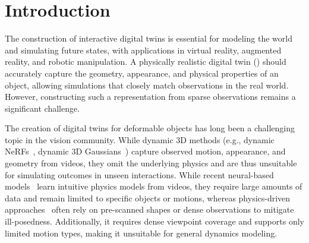 \vspace{-20pt}
\section{Introduction}

The construction of interactive digital twins is essential for modeling the world and simulating future states, with applications in virtual reality, augmented reality, and robotic manipulation. A physically realistic digital twin (\ourabbr) should accurately capture the geometry, appearance, and physical properties of an object, allowing simulations that closely match observations in the real world. However, constructing such a representation from sparse observations remains a significant challenge.

The creation of digital twins for deformable objects has long been a challenging topic in the vision community. 
While dynamic 3D methods (e.g., dynamic NeRFs~\cite{driess2023learning, li2023pac, li20223d, li2021neural, li2023dynibar, park2021nerfies, park2021hypernerf, pumarola2021d, tretschk2021non, wang2023flow, guo2023forward, cao2023hexplane, fridovich2023k, gao2022monocular, xian2021space, tretschk2021nonrigid, chu2022physics, peng2021CageNeRF}, dynamic 3D Gaussians~\cite{luiten2024dynamic, wu20244d, yang2024deformable, huang2024sc, kratimenos2024dynmf, lin2024gaussian, yu2024cogs, yang2023real, duan20244d}) capture observed motion, appearance, and geometry from videos, they omit the underlying physics and are thus unsuitable for simulating outcomes in unseen interactions. 
While recent neural-based models~\cite{wu2019learning, ma2023learning, xu2019densephysnet, evans2022context, chen2022comphy, shi2024robocraft, shi2023robocook, pfaff2020learning, lin2022learning, li2018learning, sanchez2020learning, zhang2024dynamic} learn intuitive physics models from videos, they require large amounts of data and remain limited to specific objects or motions, whereas physics-driven approaches~\cite{zhang2024physdreamer, zhong2024reconstruction, xie2024physgaussian, feng2024pie, li2023pac, Qiao2021Differentiable, du2021diffpd} often rely on pre-scanned shapes or dense observations to mitigate ill-posedness.
Additionally, it requires dense viewpoint coverage and supports only limited motion types, making it unsuitable for general dynamics modeling.


